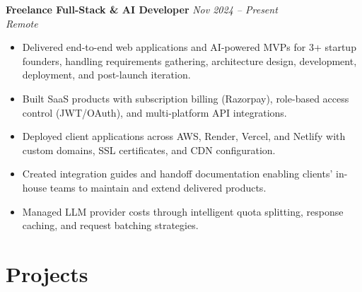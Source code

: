 \documentclass[11pt]{article}
\begin{document}
\textbf{Freelance Full-Stack \& AI Developer} \hfill \textit{Nov 2024 -- Present} \\
\textit{Remote}
\begin{itemize}
\item Delivered end-to-end web applications and AI-powered MVPs for 3+ startup founders, handling requirements gathering, architecture design, development, deployment, and post-launch iteration.
\item Built SaaS products with subscription billing (Razorpay), role-based access control (JWT/OAuth), and multi-platform API integrations.
\item Deployed client applications across AWS, Render, Vercel, and Netlify with custom domains, SSL certificates, and CDN configuration.
\item Created integration guides and handoff documentation enabling clients' in-house teams to maintain and extend delivered products.
\item Managed LLM provider costs through intelligent quota splitting, response caching, and request batching strategies.
\end{itemize}

\section*{Projects}
\end{document}
